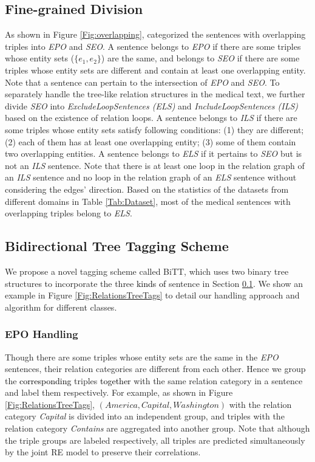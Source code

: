 \documentclass[conference]{IEEEtran}
\newcommand{\yankun}[1]{\textcolor{black}{#1}}
\begin{document}
\subsection{Fine-grained Division}
\label{ssec:Division}
As shown in Figure \ref{Fig:overlapping}, \cite{Zeng2018Extracting} categorized the sentences with overlapping triples into \emph{EPO} and \emph{SEO}. A sentence belongs to \emph{EPO} if there are some triples whose entity sets ($\{e_1, e_2\}$) are the same, and belongs to \emph{SEO} if there are some triples whose entity sets are different and contain at least one overlapping entity. Note that a sentence can pertain to the intersection of \emph{EPO} and \emph{SEO}. To separately handle the tree-like relation structures in the medical text, we further divide \emph{SEO} into \emph{ExcludeLoopSentences (ELS)} and \emph{IncludeLoopSentences (ILS)} based on the existence of relation loops. A sentence belongs to \emph{ILS} if there are some triples whose entity sets satisfy following conditions: (1) they are different; (2) each of them has at least one overlapping entity; (3) some of them contain two overlapping entities. A sentence belongs to \emph{ELS} if it pertains to \emph{SEO} but is not an \emph{ILS} sentence. Note that there is at least one loop in the relation graph of an \emph{ILS} sentence and no loop in the relation graph of an \emph{ELS} sentence without considering the edges' direction. Based on the statistics of the datasets from different domains in Table \ref{Tab:Dataset}, most of the medical sentences with overlapping triples belong to \emph{ELS}.


\subsection{Bidirectional Tree Tagging Scheme}
\label{ssec:BiTTScheme}
We propose a novel tagging scheme called BiTT, which uses two binary tree structures to incorporate the three \yankun{kinds of} sentence 
in Section \ref{ssec:Division}. We show an example in Figure \ref{Fig:RelationsTreeTags} to detail our handling approach and algorithm for different classes.

\subsubsection{EPO Handling}
\label{sssect:EPO}
Though there are some triples whose entity sets are the same in the \emph{EPO} sentences, their relation categories are different from each other. Hence we group 
the \yankun{corresponding} triples \yankun{together} with the same relation category in a sentence and label them respectively. For example, as shown in Figure \ref{Fig:RelationsTreeTags}, $(America, Capital, Washington)$ with the relation category \emph{Capital} is divided into an independent group, and 
triples with the relation category \emph{Contains} are aggregated into another group. Note that although the triple groups are labeled respectively, all triples are predicted simultaneously by the joint RE model to preserve their correlations.
\end{document}
